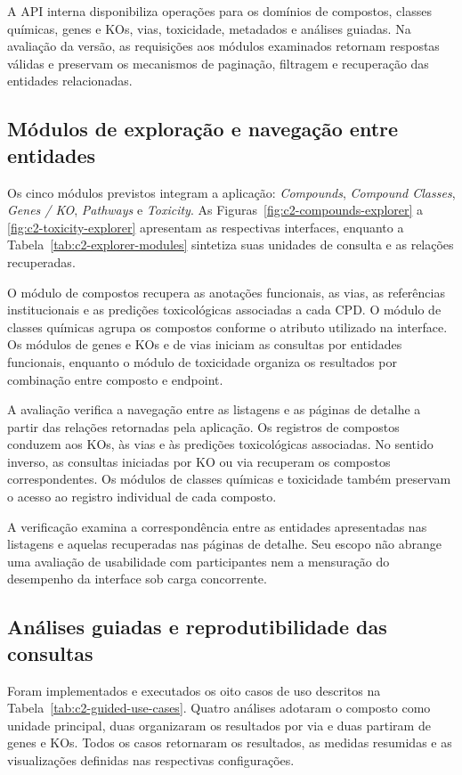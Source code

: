 A API interna disponibiliza operações para os domínios de compostos, classes
químicas, genes e KOs, vias, toxicidade, metadados e análises guiadas. Na
avaliação da versão, as requisições aos módulos examinados retornam respostas
válidas e preservam os mecanismos de paginação, filtragem e recuperação das
entidades relacionadas.

\subsection{Módulos de exploração e navegação entre entidades}

Os cinco módulos previstos integram a aplicação: \textit{Compounds},
\textit{Compound Classes}, \textit{Genes / KO}, \textit{Pathways} e
\textit{Toxicity}. As Figuras~\ref{fig:c2-compounds-explorer} a
\ref{fig:c2-toxicity-explorer} apresentam as respectivas interfaces, enquanto
a Tabela~\ref{tab:c2-explorer-modules} sintetiza suas unidades de consulta e
as relações recuperadas.

O módulo de compostos recupera as anotações funcionais, as vias, as referências
institucionais e as predições toxicológicas associadas a cada CPD. O módulo de
classes químicas agrupa os compostos conforme o atributo utilizado na
interface. Os módulos de genes e KOs e de vias iniciam as consultas por
entidades funcionais, enquanto o módulo de toxicidade organiza os resultados
por combinação entre composto e endpoint.

A avaliação verifica a navegação entre as listagens e as páginas de detalhe a
partir das relações retornadas pela aplicação. Os registros de compostos
conduzem aos KOs, às vias e às predições toxicológicas associadas. No sentido
inverso, as consultas iniciadas por KO ou via recuperam os compostos
correspondentes. Os módulos de classes químicas e toxicidade também preservam
o acesso ao registro individual de cada composto.

A verificação examina a correspondência entre as entidades apresentadas nas
listagens e aquelas recuperadas nas páginas de detalhe. Seu escopo não abrange
uma avaliação de usabilidade com participantes nem a mensuração do desempenho
da interface sob carga concorrente.

\subsection{Análises guiadas e reprodutibilidade das consultas}

Foram implementados e executados os oito casos de uso descritos na
Tabela~\ref{tab:c2-guided-use-cases}. Quatro análises adotaram o composto como
unidade principal, duas organizaram os resultados por via e duas partiram de
genes e KOs. Todos os casos retornaram os resultados, as medidas resumidas e
as visualizações definidas nas respectivas configurações.

